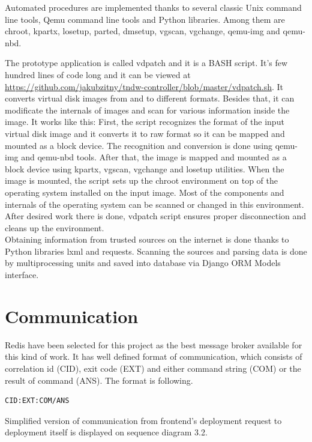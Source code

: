 \documentclass[thesis=B,english]{FITthesis}[2013/04/26]
\begin{document}
Automated procedures are implemented thanks to several classic Unix command line tools, Qemu command line tools and Python libraries. Among them are chroot, kpartx, losetup, parted, dmsetup, vgscan, vgchange, qemu-img and qemu-nbd.

The prototype application is called vdpatch and it is a BASH script. It's few hundred lines of code long and it can be viewed at \url{https://github.com/jakubzitny/tndw-controller/blob/master/vdpatch.sh}. It converts virtual disk images from and to different formats. Besides that, it can modificate the internals of images and scan for various information inside the image. It works like this: First, the script recognizes the format of the input virtual disk image and it converts it to raw format so it can be mapped and mounted as a block device. The recognition and conversion is done using qemu-img and qemu-nbd tools. After that, the image is mapped and mounted as a block device using kpartx, vgscan, vgchange and losetup utilities. When the image is mounted, the script sets up the chroot environment on top of the operating system installed on the input image. Most of the components and internals of the operating system can be scanned or changed in this environment. After desired work there is done, vdpatch script ensures proper disconnection and cleans up the environment. \\

Obtaining  information from trusted sources on the internet is done thanks to Python libraries lxml and requests. Scanning the sources and parsing data is done by multiprocessing units and saved into database via Django ORM Models interface.

\section{Communication}

Redis have been selected for this project as the best message broker available for this kind of work. It has well defined format of communication, which consists of correlation id (CID), exit code (EXT) and either command string (COM) or the result of command (ANS). The format is following.

\begin{center}
\begin{verbatim}
CID:EXT:COM/ANS
\end{verbatim}
\end{center}

Simplified version of communication from frontend's deployment request to deployment itself is displayed on sequence diagram 3.2.
\end{document}
